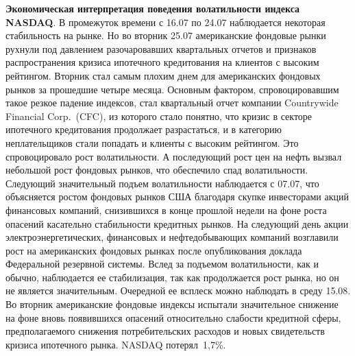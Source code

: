\begin{multicols}{2}
{\bf Экономическая интерпретация поведения волатильности индекса
NASDAQ}. В промежуток вре\-мени с 16.07 по 24.07 наблюдается
некоторая стабильность на рынке. Но во вторник 25.07 американские
фондовые рынки рухнули под давлением разочаровавших квартальных
отчетов и признаков распространения кризиса ипотечного
кредитования на клиентов с высоким рейтингом. Вторник стал самым
плохим днем для американских фондовых рынков за прошедшие четыре
месяца. Основным фактором, спровоцировавшим такое резкое падение
индексов, стал квартальный отчет компании Countrywide Financial
Corp.\ (CFC), из которого стало понятно, что кризис в секторе
ипотечного кредитования продолжает разрастаться, и в категорию
неплательщиков стали попадать и клиенты с высоким рейтингом. Это
спровоцировало рост волатильности. А последующий рост цен на нефть
вызвал небольшой рост фондовых рынков, что обеспечило спад
волатильности. Следующий значительный подъем волатильности
наблюдается с 07.07, что объясняется ростом фондовых рынков США
благодаря скупке инвесторами акций финансовых компаний,
снизившихся в конце прошлой недели на фоне рос\-та опасений
касательно стабильности кредитных рынков. На следующий день акции
электроэнергетических, финансовых и нефтедобывающих компаний
возглавили рост на американских фондовых рынках после
опубликования доклада Федеральной резервной системы. Вслед за
подъемом волатильности, как и обычно, наблюдается ее стабилизация,
так как продолжается рост рынка, но он не является значительным.
Очередной ее всплеск можно наблюдать в среду 15.08. Во вторник
американские фондовые индексы испытали значительное снижение на
фоне вновь появившихся опасений относительно слабости кредитной
сферы, пред\-по\-ла\-га\-емо\-го снижения потребительских расходов и новых
свидетельств кризиса ипотечного рынка. NASDAQ потерял~1,7\%.
\begin{figure*} %
\vspace*{1pt}
\begin{center}
\mbox{%
\epsfxsize=105.017mm
}
\end{center}
\vspace*{-9pt}
\end{figure*}



\end{multicols}
